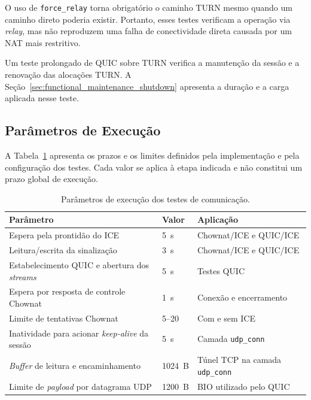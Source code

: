 O uso de \texttt{force\_relay} torna obrigatório o caminho TURN mesmo quando um caminho direto poderia existir. Portanto, esses testes verificam a operação via \textit{relay}, mas não reproduzem uma falha de conectividade direta causada por um NAT mais restritivo. 

Um teste prolongado de QUIC sobre TURN verifica a manutenção da sessão e a renovação das alocações TURN. A Seção~\ref{sec:functional_maintenance_shutdown} apresenta a duração e a carga aplicada nesse teste.

\subsection{Parâmetros de Execução}
\label{sec:execution_parameters}

A Tabela~\ref{tab:experimental_parameters} apresenta os prazos e os limites definidos pela implementação e pela configuração dos testes. Cada valor se aplica à etapa indicada e não constitui um prazo global de execução.

\begin{table}[htbp]
    \centering
    \caption{Parâmetros de execução dos testes de comunicação.}
    \label{tab:experimental_parameters}
    \begin{tabular}{@{}p{}p{}p{}@{}}
        \toprule
        \textbf{Parâmetro} &
        \textbf{Valor} &
        \textbf{Aplicação} \\
        \midrule
        Espera pela prontidão do ICE &
        5~s & Chownat/ICE e QUIC/ICE \\
        Leitura/escrita da sinalização &
        3~s & Chownat/ICE e QUIC/ICE \\
        Estabelecimento QUIC e abertura dos \textit{streams} &
        5~s & Testes QUIC \\
        Espera por resposta de controle Chownat &
        1~s & Conexão e encerramento \\
        Limite de tentativas Chownat &
        5--20 & Com e sem ICE \\
        Inatividade para acionar \textit{keep-alive}
        da sessão &
        5~s & Camada \texttt{udp\_conn} \\
        \textit{Buffer} de leitura e encaminhamento &
        1024~B & Túnel TCP na camada \texttt{udp\_conn} \\
        Limite de \textit{payload} por datagrama UDP &
        1200~B & BIO utilizado pelo QUIC \\
        \bottomrule
    \end{tabular}
\end{table}

